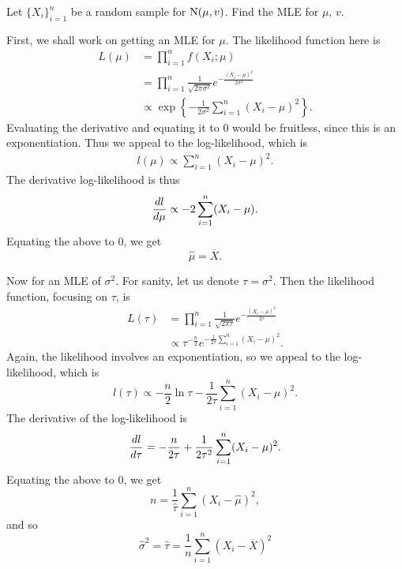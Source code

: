 \documentclass[notoc,notitlepage]{tufte-book}
\begin{document}
\begin{eg}
  Let $\{ X_i \}_{i=1}^n$ be a random sample for $\operatorname{N}(\mu, v)$. Find the MLE
  for $\mu,\, v$.
\end{eg}

\begin{solution}
  First, we shall work on getting an MLE for $\mu$. The likelihood function here
  is
  \begin{align*}
    L(\mu) &= \prod_{i=1}^{n} f(X_i; \mu) \\
           &= \prod_{i=1}^{n} \frac{1}{\sqrt{2\pi\sigma^2}} e^{-\frac{(X_i -
           \mu)^2}{2\sigma^2}} \\
           &\propto \exp \left\{ - \frac{1}{2\sigma^2} \sum_{i=1}^{n} (X_i -
           \mu)^2 \right\}.
  \end{align*}
  Evaluating the derivative and equating it to $0$ would be fruitless, since
  this is an exponentiation. Thus we appeal to the log-likelihood, which is
  \begin{align*}
    l(\mu) \propto \sum_{i=1}^{n} (X_i - \mu)^2.
  \end{align*}
  The derivative log-likelihood is thus
  \begin{equation*}
    \frac{\mathop{}\!d{l}}{\mathop{}\!d{\mu}} \propto -2 \sum_{i=1}^{n} (X_i - \mu).
  \end{equation*}
  Equating the above to $0$, we get
  \begin{equation*}
    \hat{\mu} = \overline{X}.
  \end{equation*}

  Now for an MLE of $\sigma^2$. For sanity, let us denote $\tau = \sigma^2$.
  Then the likelihood function, focusing on $\tau$, is
  \begin{align*}
    L(\tau) &= \prod_{i=1}^{n} \frac{1}{\sqrt{2\pi\tau}} e^{-\frac{(X_i -
              \mu)^2}{2\tau}} \\
            &\propto \tau^{-\frac{n}{2}} e^{-\frac{1}{2\tau} \sum_{i=1}^{n} (X_i
            - \mu)^2}.
  \end{align*}
  Again, the likelihood involves an exponentiation, so we appeal to the
  log-likelihood, which is
  \begin{equation*}
    l(\tau) \propto -\frac{n}{2} \ln \tau - \frac{1}{2\tau} \sum_{i=1}^{n} (X_i
    - \mu)^2.
  \end{equation*}
  The derivative of the log-likelihood is
  \begin{equation*}
    \frac{\mathop{}\!d{l}}{\mathop{}\!d{\tau}} = -\frac{n}{2\tau} + \frac{1}{2\tau^2}
    \sum_{i=1}^{n} (X_i - \mu)^2.
  \end{equation*}
  Equating the above to $0$, we get
  \begin{equation*}
    n = \frac{1}{\hat{\tau}} \sum_{i=1}^{n} (X_i - \hat{\mu})^2,
  \end{equation*}
  and so
  \begin{equation*}
    \hat{\sigma}^2 = \hat{\tau} = \frac{1}{n} \sum_{i=1}^{n} (X_i -
    \overline{X})^2
  \end{equation*}
\end{solution}
\end{document}
